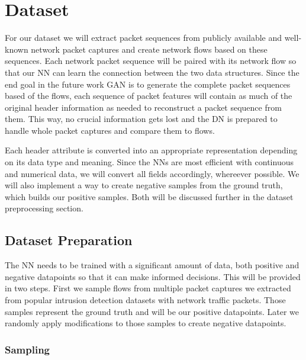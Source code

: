 \documentclass[
	ngerman,
	ruledheaders=section,%
	class=report,%
	thesis={type=bachelor},%
	accentcolor=9c,%
	custommargins=true,%
	marginpar=false,%
	parskip=half-,%
	fontsize=11pt,%
]{tudapub}
\begin{document}

\section{Dataset}

For our dataset we will extract packet sequences from publicly available and well-known network packet captures and create network flows based on these sequences.
Each network packet sequence will be paired with its network flow so that our NN can learn the connection between the two data structures.
Since the end goal in the future work GAN is to generate the complete packet sequences based of the flows,
each sequence of packet features will contain as much of the original header information as needed to reconstruct a packet sequence from them.
This way, no crucial information gets lost and the DN is prepared to handle whole packet captures and compare them to flows.

Each header attribute is converted into an appropriate representation depending on its data type and meaning.
Since the NNs are most efficient with continuous and numerical data, we will convert all fields accordingly, whereever possible.
We will also implement a way to create negative samples from the ground truth, which builds our positive samples.
Both will be discussed further in the dataset preprocessing section.

\subsection{Dataset Preparation}

The NN needs to be trained with a significant amount of data, both positive and negative datapoints so that it can make informed decisions.
This will be provided in two steps.
First we sample flows from multiple packet captures we extracted from popular intrusion detection datasets with network traffic packets.
Those samples represent the ground truth and will be our positive datapoints.
Later we randomly apply modifications to those samples to create negative datapoints.

\subsubsection{Sampling}
\end{document}
